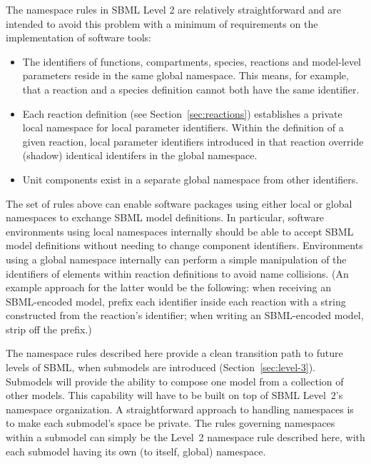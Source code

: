 \documentclass[10pt]{cekarticle}
\begin{document}
The namespace rules in SBML Level 2 are relatively straightforward
and are intended to avoid this problem with a minimum of
requirements on the implementation of software tools:
\begin{itemize}

\item The identifiers of functions, compartments, species,
reactions and model-level parameters reside in the same global
namespace. This means, for example, that a reaction and a species
definition cannot both have the same identifier.

\item Each reaction definition (see Section~\ref{sec:reactions})
  establishes a private local namespace for local parameter identifiers. Within the
  definition of a given reaction, local parameter identifiers introduced in that
  reaction override (shadow) identical identifers in the global namespace.

\item Unit components exist in a separate global namespace from
other identifiers.

\end{itemize}

The set of rules above can enable software packages using either
local or global namespaces to exchange SBML model definitions.  In
particular, software environments using local namespaces
internally should be able to accept SBML model definitions without
needing to change component identifiers. Environments using a
global namespace internally can perform a simple manipulation of
the identifiers of elements within reaction definitions to avoid
name collisions.  (An example approach for the latter would be the
following: when receiving an SBML-encoded model, prefix each
identifier inside each reaction with a string constructed from the
reaction's identifier; when writing an SBML-encoded model, strip
off the prefix.)

The namespace rules described here provide a clean transition path
to future levels of SBML, when submodels are introduced
(Section~\ref{sec:level-3}).  Submodels will provide the ability
to compose one model from a collection of other models.  This
capability will have to be built on top of SBML Level~2's
namespace organization.  A straightforward approach to handling
namespaces is to make each submodel's space be private.  The rules
governing namespaces within a submodel can simply be the Level~2
namespace rule described here, with each submodel having its own
(to itself, global) namespace.
\end{document}
